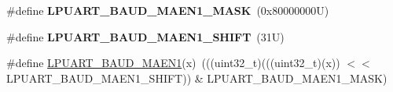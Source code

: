 \begin{DoxyCompactItemize}
\mbox{\label{group___l_p_u_a_r_t___register___masks_ga2058e9d94b7e45009d7bc30523066e92}} 
\#define {\bfseries L\+P\+U\+A\+R\+T\+\_\+\+B\+A\+U\+D\+\_\+\+M\+A\+E\+N1\+\_\+\+M\+A\+SK}~(0x80000000\+U)
\item 
\mbox{\label{group___l_p_u_a_r_t___register___masks_gaa06c245c6a8effbb4a3d207716c44a43}} 
\#define {\bfseries L\+P\+U\+A\+R\+T\+\_\+\+B\+A\+U\+D\+\_\+\+M\+A\+E\+N1\+\_\+\+S\+H\+I\+FT}~(31\+U)
\item 
\#define \mbox{\hyperlink{group___l_p_u_a_r_t___register___masks_ga9525dc15acbc7a1a0b9a4e86a9f9d888}{L\+P\+U\+A\+R\+T\+\_\+\+B\+A\+U\+D\+\_\+\+M\+A\+E\+N1}}(x)~(((uint32\+\_\+t)(((uint32\+\_\+t)(x)) $<$$<$ L\+P\+U\+A\+R\+T\+\_\+\+B\+A\+U\+D\+\_\+\+M\+A\+E\+N1\+\_\+\+S\+H\+I\+FT)) \& L\+P\+U\+A\+R\+T\+\_\+\+B\+A\+U\+D\+\_\+\+M\+A\+E\+N1\+\_\+\+M\+A\+SK)
\end{DoxyCompactItemize}
